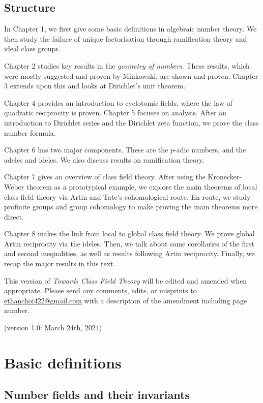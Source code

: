 \documentclass[a4paper, 12pt,oneside,openany]{book}
\begin{document}
\section{Structure}

In Chapter 1, we first give some basic definitions in algebraic number theory. We then study the failure of unique factorisation through ramification theory and ideal class groups.

Chapter 2 studies key results in the \emph{geometry of numbers}. These results, which were mostly suggested and proven by Minkowski, are shown and proven. Chapter 3 extends upon this and looks at Dirichlet's unit theorem.

Chapter 4 provides an introduction to cyclotomic fields, where the law of quadratic reciprocity is proven. Chapter 5 focuses on analysis. After an introduction to Dirichlet series and the Dirichlet zeta function, we prove the class number formula.

Chapter 6 has two major components. These are the $p$-adic numbers, and the adeles and ideles. We also discuss results on ramification theory.

Chapter 7 gives an overview of class field theory. After using the Kronecker-Weber theorem as a prototypical example, we explore the main theorems of local class field theory via Artin and Tate's cohomological route. En route, we study profinite groups and group cohomology to make proving the main theorems more direct.

Chapter 8 makes the link from local to global class field theory. We prove global Artin reciprocity via the ideles. Then, we talk about some corollaries of the first and second inequalities, as well as results following Artin reciprocity. Finally, we recap the major results in this text.

This version of \emph{Towards Class Field Theory} will be edited and amended when appropriate. Please send any comments, edits, or misprints to \url{ethanchoi422@gmail.com} with a description of the amendment including page number. 

(version 1.0: March 24th, 2024)
\newpage

\chapter{Basic definitions}
\minitoc
\section{Number fields and their invariants}
\end{document}

